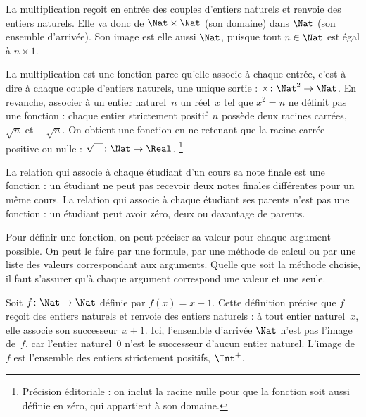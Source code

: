 \documentclass[11pt,a4paper,openany]{memoir}
\begin{document}
\begin{ex}
La multiplication reçoit en entrée des couples d’entiers naturels et
renvoie des entiers naturels. Elle va donc de $\Nat \times \Nat$
(son domaine) dans $\Nat$ (son ensemble d’arrivée).
Son image est elle aussi $\Nat$, puisque tout $n \in \Nat$ est égal à
$n \times 1$.
\end{ex}

\begin{ex}
La multiplication est une fonction parce qu’elle associe à chaque entrée,
c’est-à-dire à chaque couple d’entiers naturels, une unique sortie :
$\times \colon \Nat^2 \to \Nat$. En revanche, associer à un entier
naturel~$n$ un réel~$x$ tel que $x^2 = n$ ne définit pas une fonction :
chaque entier strictement positif~$n$ possède deux racines carrées,
$\sqrt{n}$ et~$-\sqrt{n}$. On obtient une fonction en ne retenant que
la racine carrée positive ou nulle :
$\sqrt{\phantom{X}} \colon \Nat \to \Real$.
\footnote{Précision éditoriale : on inclut la racine nulle pour que
la fonction soit aussi définie en zéro, qui appartient à son domaine.}
\end{ex}

\begin{ex}
La relation qui associe à chaque étudiant d’un cours sa note finale est
une fonction : un étudiant ne peut pas recevoir deux notes finales
différentes pour un même cours. La relation qui associe à chaque étudiant
ses parents n’est pas une fonction : un étudiant peut avoir zéro, deux
ou davantage de parents.
\end{ex}

\begin{explain}
Pour définir une fonction, on peut préciser sa valeur pour chaque
argument possible. On peut le faire par une formule, par une méthode
de calcul ou par une liste des valeurs correspondant aux arguments.
Quelle que soit la méthode choisie, il faut s’assurer qu’à chaque
argument correspond une valeur et une seule.
\end{explain}

\begin{ex}
Soit $f \colon \Nat \to \Nat$ définie par $f(x) = x+1$.
Cette définition précise que $f$ reçoit des entiers naturels et renvoie
des entiers naturels : à tout entier naturel~$x$, elle associe son
successeur~$x+1$. Ici, l’ensemble d’arrivée $\Nat$ n’est pas l’image
de~$f$, car l’entier naturel~$0$ n’est le successeur d’aucun entier naturel.
L’image de~$f$ est l’ensemble des entiers strictement positifs, $\Int^{+}$.
\end{ex}
\end{document}
